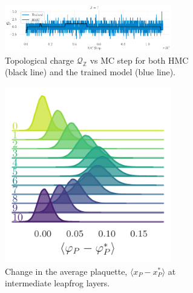 \documentclass{article} %
\begin{document}
%
%
%
\begin{figure}[htpb]
   \centering
   \begin{subfigure}{\textwidth}
      \centering
      \includegraphics[width=0.8\textwidth]{figures/topological_freezing_anl_blue_wide.pdf}
      \caption{\label{fig:topological_freezing}Topological charge \(\mathcal{Q}_{\mathbb{Z}}\) vs MC
      step for both HMC (black line) and the trained model (blue line).}%
   \end{subfigure}
   \hfill
   \begin{subfigure}{0.32\textwidth}
      \centering
      \includegraphics[width=0.8\textwidth]{figures/plaqsf_1758.pdf}
      \caption{\label{fig:plaqsf}Change in the average plaquette, \(\langle x_{P}-x_{P}^{*}\rangle\) at intermediate leapfrog layers.}
   \end{subfigure}
   \hfill
   \begin{subfigure}{0.32\textwidth}

\end{subfigure}
\end{figure}
\end{document}
